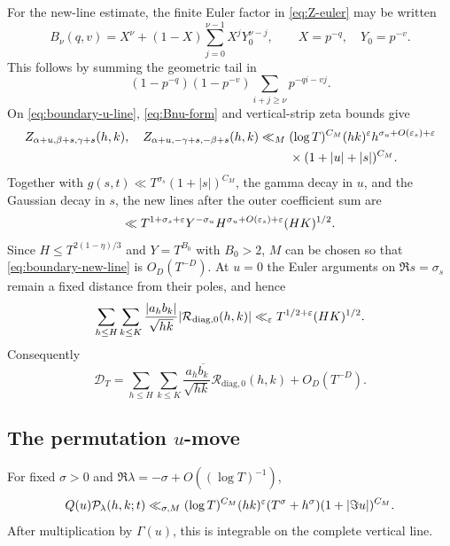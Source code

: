 For the new-line estimate, the finite Euler factor in
\eqref{eq:Z-euler} may be written
\begin{equation}\label{eq:Bnu-form}
 B_\nu(q,v)=X^\nu+(1-X)\sum_{j=0}^{\nu-1}X^jY_0^{\nu-j},
 \qquad X=p^{-q},\quad Y_0=p^{-v}.
\end{equation}
This follows by summing the geometric tail in
\[
 (1-p^{-q})(1-p^{-v})\sum_{i+j\geq\nu}p^{-qi-vj}.
\]
On \eqref{eq:boundary-u-line}, \eqref{eq:Bnu-form} and vertical-strip zeta
bounds give
\begin{align}
 Z_{\alpha+u,\beta+s,\gamma+s}(h,k),\quad
 Z_{\alpha+u,-\gamma+s,-\beta+s}(h,k)
 \ll_M{}&(\log T)^{C_M}(hk)^\varepsilon
 h^{\sigma_u+O(\varepsilon_s)+\varepsilon}
 \notag\\
 &\times(1+|u|+|s|)^{C_M}.
 \label{eq:boundary-Z-bound}
\end{align}
Together with $g(s,t)\ll T^{\sigma_s}(1+|s|)^{C_M}$, the gamma decay in
$u$, and the Gaussian decay in $s$, the new lines after the outer coefficient
sum are
\begin{equation}\label{eq:boundary-new-line}
 \ll T^{1+\sigma_s+\varepsilon}Y^{-\sigma_u}
 H^{\sigma_u+O(\varepsilon_s)+\varepsilon}(HK)^{1/2}.
\end{equation}
Since $H\leq T^{2(1-\eta)/3}$ and $Y=T^{B_0}$ with $B_0>2$, $M$ can be
chosen so that \eqref{eq:boundary-new-line} is $O_D(T^{-D})$.  At $u=0$ the
Euler arguments on $\Re s=\sigma_s$ remain a fixed distance from their poles,
and hence
\begin{equation}\label{eq:boundary-zero-bound}
 \sum_{h\leq H}\sum_{k\leq K}
 \frac{|a_hb_k|}{\sqrt{hk}}
 |\mathcal R_{\mathrm{diag},0}(h,k)|
 \ll_\varepsilon T^{1/2+\varepsilon}(HK)^{1/2}.
\end{equation}
Consequently
\begin{equation}\label{eq:boundary-move-result}
 \mathscr D_T
 =\sum_{h\leq H}\sum_{k\leq K}
 \frac{a_h\overline{b_k}}{\sqrt{hk}}
 \mathcal R_{\mathrm{diag},0}(h,k)+O_D(T^{-D}).
\end{equation}

\subsection{The permutation \texorpdfstring{$u$}{u}-move}

\begin{lemma}\label{lem:P-left-line}
For fixed $\sigma>0$ and
$\Re\lambda=-\sigma+O((\log T)^{-1})$,
\begin{equation}\label{eq:P-left-bound}
 Q(u)\mathcal P_\lambda(h,k;t)
 \ll_{\sigma,M}(\log T)^{C_M}(hk)^\varepsilon
 (T^\sigma+h^\sigma)(1+|\Im u|)^{C_M}.
\end{equation}
After multiplication by $\Gamma(u)$, this is integrable on the complete
vertical line.
\end{lemma}

